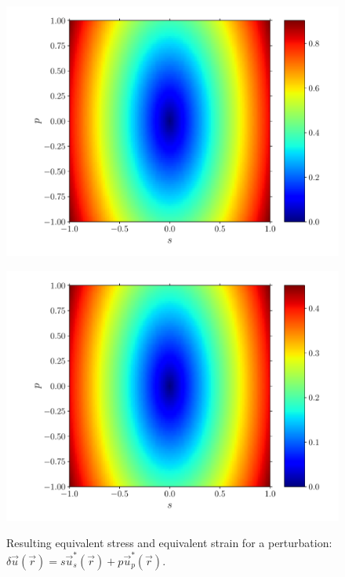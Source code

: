 \documentclass[fleqn]{goose-article}
\begin{document}
\begin{figure}[htp]
    \centering
    \captionsetup[subfigure]{justification=centering}
    \begin{minipage}[t]{.49\textwidth}
        \centering
        \includegraphics[width=\textwidth]{phase-diagram_sig.pdf}
        \label{fig:phase-diagram:sig}
    \end{minipage}
    \hfill
    \begin{minipage}[t]{.49\textwidth}
        \centering
        \includegraphics[width=\textwidth]{phase-diagram_eps.pdf}
        \label{fig:phase-diagram:eps}
    \end{minipage}
    \caption{
        Resulting
         equivalent stress and
         equivalent strain
        for a perturbation:
        $\delta \vec{u}(\vec{r}) = s \vec{u}^*_s (\vec{r}) + p \vec{u}^*_p (\vec{r})$.
    }
    \label{fig:phase-diagram}
\end{figure}
\end{document}
